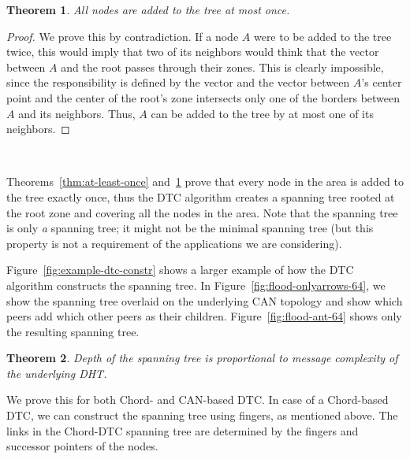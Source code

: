\documentclass[fleqn,12pt,twoside]{article}
\newtheorem{theorem}{Theorem}
\begin{document}
\begin{theorem}
  \label{thm:at-most-once}
  All nodes are added to the tree at most once.
\end{theorem}
\begin{proof}
  We prove this by contradiction. If a node $A$ were to be added to
  the tree twice, this would imply that two of its neighbors would
  think that the vector between $A$ and the root passes through their
  zones. This is clearly impossible, since the responsibility is
  defined by the vector and the vector between $A$'s center point and
  the center of the root's zone intersects only one of the borders
  between $A$ and its neighbors. Thus, $A$ can be added to the tree by
  at most one of its neighbors.
\end{proof}

\begin{figure*}[!tb]
  \centering
  \mbox{
    \quad
    }
  \caption{Example of DTC-constructed tree}
  \label{fig:example-dtc-constr}
  \vskip -5mm
\end{figure*}



Theorems~\ref{thm:at-least-once} and~\ref{thm:at-most-once} prove that
every node in the area is added to the tree exactly once, thus the DTC
algorithm creates a spanning tree rooted at the root zone and covering
all the nodes in the area. Note that the spanning tree is only
\emph{a} spanning tree; it might not be the minimal spanning tree (but
this property is not a requirement of the applications we are considering).


Figure~\ref{fig:example-dtc-constr} shows a larger example of how the
DTC algorithm constructs the spanning tree. In
Figure~\ref{fig:flood-onlyarrows-64}, we show the spanning tree
overlaid on the underlying CAN topology and show which peers add which
other peers as their children. Figure~\ref{fig:flood-ant-64} shows only the
resulting spanning tree.


\begin{theorem}
  Depth of the spanning tree is proportional to message complexity of
  the underlying DHT.
\end{theorem}

We prove this for both Chord- and CAN-based DTC.  In case of a
Chord-based DTC, we can construct the spanning tree using fingers, as
mentioned above. The links in the Chord-DTC spanning tree are
determined by the fingers and successor pointers of the nodes.
\end{document}
